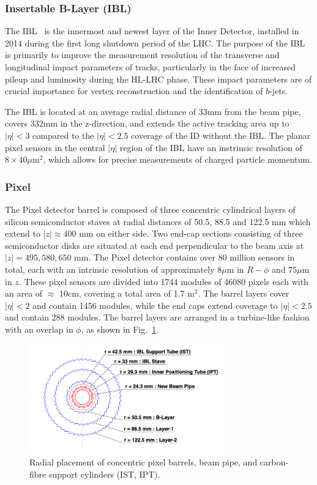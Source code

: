 \subsubsection{Insertable B-Layer (IBL)}
The IBL~\cite{Capeans:1291633} is the innermost and newest layer of the Inner Detector, installed in 2014 during the first long shutdown period of the LHC.
The purpose of the IBL is primarily to improve the measurement resolution of the transverse and longitudinal impact parameters of tracks, particularly in the face of increased pileup and luminosity during the HL-LHC phase.
These impact parameters are of crucial importance for vertex reconstruction and the identification of $b$-jets. 

The IBL is located at an average radial distance of 33mm from the beam pipe, covers $332$mm in the z-direction, and extends the active tracking area up to $|\eta| < 3$ compared to the $|\eta| < 2.5$ coverage of the ID without the IBL.
The planar pixel sensors in the central $|\eta|$ region of the IBL have an instrinsic resolution of $8 \times 40 \mu \mathrm{m}^2$, which allows for precise measurements of charged particle momentum.

\subsubsection{Pixel}
The Pixel detector barrel is composed of three concentric cylindrical layers of silicon semiconductor staves at radial distances of 50.5, 88.5 and 122.5 mm which extend to $|z| \approx 400$ mm on either side.
Two end-cap sections consisting of three semiconductor disks are situated at each end perpendicular to the beam axis at $|z| = 495, 580, 650$ mm.
The Pixel detector contains over 80 million sensors in total, each with an intrinsic resolution of approximately $8\mu$m in $R-\phi$ and $75\mu$m in $z$.
These pixel sensors are divided into 1744 modules of 46080 pixels each with an area of $\approx$ 10cm, covering a total area of 1.7 $\mathrm{m}^2$.
The barrel layers cover $|\eta| < 2$ and contain 1456 modules, while the end caps extend coverage to $|\eta| < 2.5$ and contain 288 modules.
The barrel layers are arranged in a turbine-like fashion with an overlap in $\phi$, as shown in Fig.~\ref{fig:pixel_ibl_cross_section}.

\begin{figure}
	\centering
	\includegraphics[width=0.75\textwidth]{pixel_ibl_cross_section}
	\caption{Radial placement of concentric pixel barrels, beam pipe, and carbon-fibre support cylinders (IST, IPT). \cite{Pernegger:1985432} }
	\label{fig:pixel_ibl_cross_section}
\end{figure}

